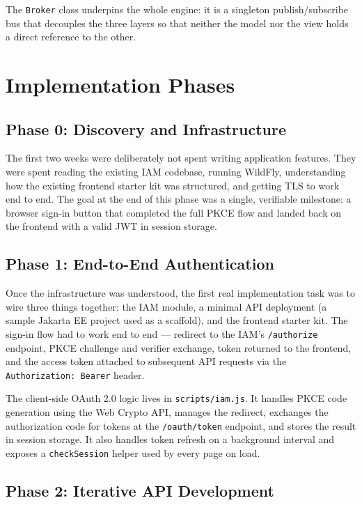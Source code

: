 The \texttt{Broker} class underpins the whole engine: it is a singleton publish/subscribe
bus that decouples the three layers so that neither the model nor the view holds a direct
reference to the other.

\section{Implementation Phases}

\subsection{Phase 0: Discovery and Infrastructure}

The first two weeks were deliberately not spent writing application features. They were
spent reading the existing IAM codebase, running WildFly, understanding how the existing
frontend starter kit was structured, and getting TLS to work end to end. The goal at the
end of this phase was a single, verifiable milestone: a browser sign-in button that
completed the full PKCE flow and landed back on the frontend with a valid JWT in
session storage.

\subsection{Phase 1: End-to-End Authentication}

Once the infrastructure was understood, the first real implementation task was to wire
three things together: the IAM module, a minimal API deployment (a sample Jakarta EE
project used as a scaffold), and the frontend starter kit. The sign-in flow had to work
end to end --- redirect to the IAM's \texttt{/authorize} endpoint, PKCE challenge and
verifier exchange, token returned to the frontend, and the access token attached to
subsequent API requests via the \texttt{Authorization: Bearer} header.

The client-side OAuth 2.0 logic lives in \texttt{scripts/iam.js}. It handles PKCE
code generation using the Web Crypto API, manages the redirect, exchanges the
authorization code for tokens at the \texttt{/oauth/token} endpoint, and stores the
result in session storage. It also handles token refresh on a background interval and
exposes a \texttt{checkSession} helper used by every page on load.

\subsection{Phase 2: Iterative API Development}

